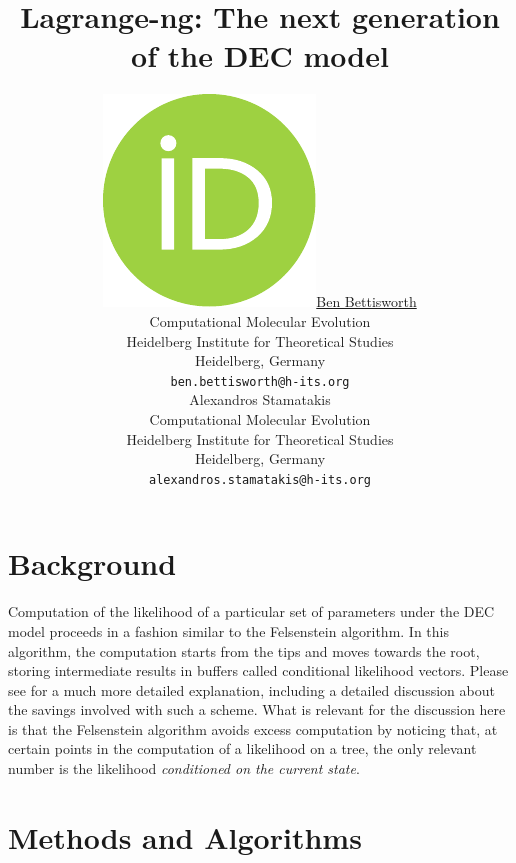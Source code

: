 \documentclass{article}
\title{Lagrange-ng: The next generation of the DEC model}
\author{\href{https://orcid.org/0000-0002-9130-6878}{\includegraphics[scale=0.06]{orcid.pdf}\hspace{1mm}Ben Bettisworth}\\
  Computational Molecular Evolution\\
  Heidelberg Institute for Theoretical Studies\\
  Heidelberg, Germany \\
  \texttt{ben.bettisworth@h-its.org} \\
  \And
  Alexandros Stamatakis\\
  Computational Molecular Evolution\\
  Heidelberg Institute for Theoretical Studies\\
  Heidelberg, Germany\\
  \texttt{alexandros.stamatakis@h-its.org} \\
}
\begin{document}
\maketitle

\section{Background}

Computation of the likelihood of a particular set of parameters under the DEC model proceeds in a fashion similar to the
Felsenstein algorithm. In this algorithm, the computation starts from the tips and moves towards the root, storing
intermediate results in buffers called conditional likelihood vectors. Please see \cite{yang2006computational} for a
much more detailed explanation, including a detailed discussion about the savings involved with such a scheme. What is
relevant for the discussion here is that the Felsenstein algorithm avoids excess computation by noticing that, at
certain points in the computation of a likelihood on a tree, the only relevant number is the likelihood
\textit{conditioned on the current state}.

\section{Methods and Algorithms}
\label{sec:methods}
\end{document}
